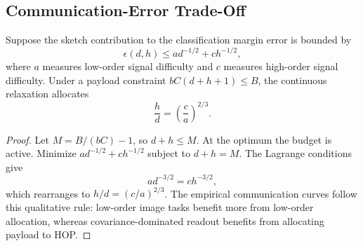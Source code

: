 \subsection{Communication-Error Trade-Off}

\begin{theorem}
Suppose the sketch contribution to the classification margin error is bounded by
\begin{equation}
    \epsilon(d,h)\le a d^{-1/2}+c h^{-1/2},
\end{equation}
where \(a\) measures low-order signal difficulty and \(c\) measures high-order signal difficulty. Under a payload constraint \(bC(d+h+1)\le B\), the continuous relaxation allocates
\begin{equation}
    \frac{h}{d}=\left(\frac{c}{a}\right)^{2/3}.
\end{equation}
\end{theorem}

\begin{proof}
Let \(M=B/(bC)-1\), so \(d+h\le M\). At the optimum the budget is active. Minimize \(a d^{-1/2}+c h^{-1/2}\) subject to \(d+h=M\). The Lagrange conditions give
\begin{equation}
    a d^{-3/2}=c h^{-3/2},
\end{equation}
which rearranges to \(h/d=(c/a)^{2/3}\). The empirical communication curves follow this qualitative rule: low-order image tasks benefit more from low-order allocation, whereas covariance-dominated readout benefits from allocating payload to HOP.
\end{proof}
